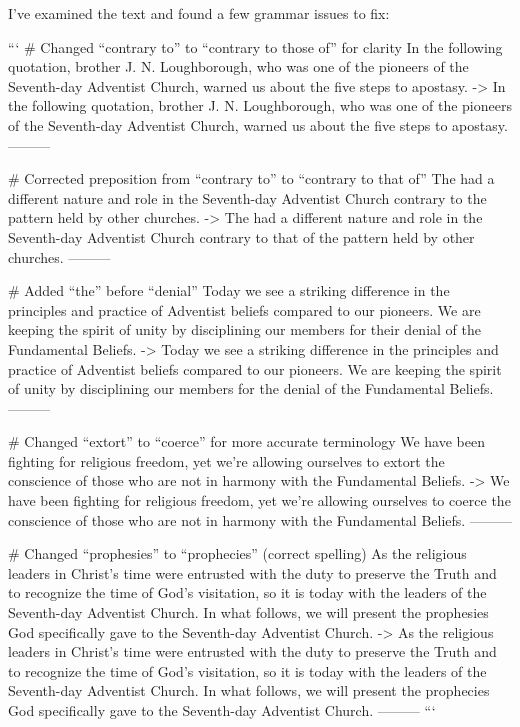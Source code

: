 I've examined the text and found a few grammar issues to fix:

```
# Changed “contrary to” to “contrary to those of” for clarity
In the following quotation, brother J. N. Loughborough, who was one of the pioneers of the Seventh-day Adventist Church, warned us about the five steps to apostasy.
->
In the following quotation, brother J. N. Loughborough, who was one of the pioneers of the Seventh-day Adventist Church, warned us about the five steps to apostasy.
---------

# Corrected preposition from “contrary to” to “contrary to that of”
The  had a different nature and role in the Seventh-day Adventist Church contrary to the pattern held by other churches.
->
The  had a different nature and role in the Seventh-day Adventist Church contrary to that of the pattern held by other churches.
---------

# Added “the” before “denial”
Today we see a striking difference in the principles and practice of Adventist beliefs compared to our pioneers. We are keeping the spirit of unity by disciplining our members for their denial of the Fundamental Beliefs.
->
Today we see a striking difference in the principles and practice of Adventist beliefs compared to our pioneers. We are keeping the spirit of unity by disciplining our members for the denial of the Fundamental Beliefs.
---------

# Changed “extort” to “coerce” for more accurate terminology
We have been fighting for religious freedom, yet we're allowing ourselves to extort the conscience of those who are not in harmony with the Fundamental Beliefs.
->
We have been fighting for religious freedom, yet we're allowing ourselves to coerce the conscience of those who are not in harmony with the Fundamental Beliefs.
---------

# Changed “prophesies” to “prophecies” (correct spelling)
As the religious leaders in Christ's time were entrusted with the duty to preserve the Truth and to recognize the time of God's visitation, so it is today with the leaders of the Seventh-day Adventist Church. In what follows, we will present the prophesies God specifically gave to the Seventh-day Adventist Church.
->
As the religious leaders in Christ's time were entrusted with the duty to preserve the Truth and to recognize the time of God's visitation, so it is today with the leaders of the Seventh-day Adventist Church. In what follows, we will present the prophecies God specifically gave to the Seventh-day Adventist Church.
---------
```